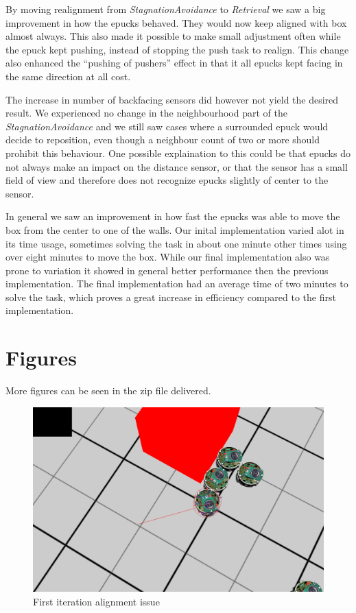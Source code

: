 \documentclass[12pt]{article}
\newcommand{\shiftline}[0]{\hfill\newline\noindent}
\begin{document}
		\shiftline By moving realignment from \textit{StagnationAvoidance} to \textit{Retrieval} we saw a big improvement in how the epucks behaved. 
		They would now keep aligned with box almost always. This also made it possible to make small adjustment often while the epuck kept pushing, 
		instead of stopping the push task to realign. This change also enhanced the "`pushing of pushers"' effect in that it all epucks kept facing in the same direction at all cost. 
		
		
		\shiftline The increase in number of backfacing sensors did however not yield the desired result.
		We experienced no change in the neighbourhood part of the \textit{StagnationAvoidance} and we still
		saw cases where a surrounded epuck would decide to reposition, even though a neighbour count of two or more should prohibit this behaviour. 
		One possible explaination to this could be that epucks do not always make an impact on the distance sensor, or that the sensor has a small
		field of view and therefore does not recognize epucks slightly of center to the sensor.
		
		\shiftline In general we saw an improvement in how fast the epucks was able to move the box from the center to one of the walls. 
		Our inital implementation varied alot in its time usage, sometimes solving the task in about one minute other times using over eight minutes to move the box.
		While our final implementation also was prone to variation it showed in general better performance then the previous implementation. 
		The final implementation had an average time of two minutes to solve the task, which proves a great increase in efficiency compared to the first implementation.
		
\section{Figures}
	More figures can be seen in the zip file delivered. 
	\begin{figure}[H]
		\centering
		\includegraphics[width=.8\columnwidth]{./images/firstIterationImplementationAlignmentIssue.png}%
		\caption{First iteration alignment issue}
		\label{fig:alignment}	
	\end{figure}
	
\end{document}
